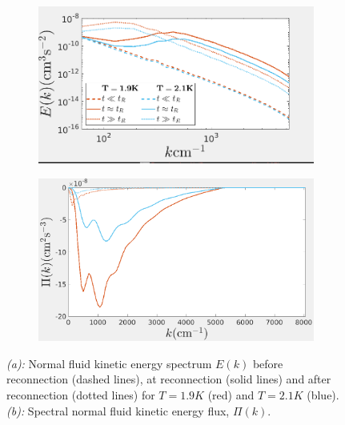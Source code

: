 \documentclass[a4paper,10pt]{article}
\begin{document}
    \begin{figure}[h!]
    \centering
    \begin{subfigure}{0.49\textwidth}
        \centering
        \includegraphics*[width=\textwidth]{K_dimensional_clean.png}
        \caption{}
    \end{subfigure}
    \begin{subfigure}{0.49\textwidth}
        \centering
        \includegraphics*[width=\textwidth]{K_flux_dimensional_clean.png}
        \caption{}
    \end{subfigure}
    \caption{\emph{(a):} Normal fluid kinetic energy spectrum $E(k)$ before 
reconnection (dashed lines), at reconnection (solid lines) 
and after reconnection (dotted lines) for $T=1.9K$ (red)
and $T=2.1K$ (blue).\emph{(b):} Spectral normal fluid kinetic energy flux, $\Pi (k)$. 
}
\end{figure}
\end{document}
